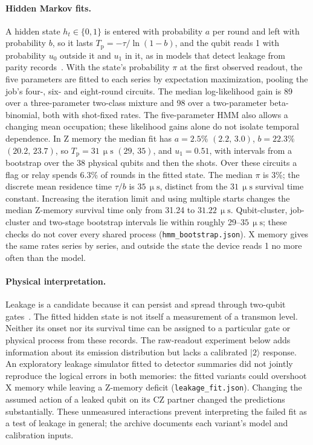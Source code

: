 \documentclass[aps,pra,reprint,nofootinbib,longbibliography,floatfix,showkeys]{revtex4-2}
\newcommand{\ket}[1]{\lvert #1\rangle}
\newcommand{\us}{\,\upmu\mathrm{s}}
\newcommand{\ci}[2]{\ensuremath{(#1,\,#2)}}
\begin{document}
\paragraph*{Hidden Markov fits.}
A hidden state $h_t \in \{0, 1\}$ is entered with probability $a$ per round and left with probability $b$, so it lasts $T_\mathrm{p} = -\tau/\ln(1-b)$, and the qubit reads 1 with probability $u_0$ outside it and $u_1$ in it, as in models that detect leakage from parity records~\cite{bultink2020protecting,varbanov2020leakage}.
With the state's probability $\pi$ at the first observed readout, the five parameters are fitted to each series by expectation maximization, pooling the job's four-, six- and eight-round circuits.
The median log-likelihood gain is 89 over a three-parameter two-class mixture and 98 over a two-parameter beta-binomial, both with shot-fixed rates.
The five-parameter HMM also allows a changing mean occupation; these likelihood gains alone do not isolate temporal dependence.
In Z memory the median fit has $a = 2.5\%$ \ci{2.2}{3.0}, $b = 22.3\%$ \ci{20.2}{23.7}, so $T_\mathrm{p} = 31\us$ \ci{29}{35}, and $u_1 = 0.51$, with intervals from a bootstrap over the 38 physical qubits and then the shots.
Over these circuits a flag or relay spends 6.3\% of rounds in the fitted state.
The median $\pi$ is 3\%; the discrete mean residence time $\tau/b$ is $35\us$, distinct from the $31\us$ survival time constant.
Increasing the iteration limit and using multiple starts changes the median Z-memory survival time only from 31.24 to $31.22\us$.
Qubit-cluster, job-cluster and two-stage bootstrap intervals lie within roughly 29--$35\us$; these checks do not cover every shared process (\texttt{hmm\_bootstrap.json}).
X memory gives the same rates series by series, and outside the state the device reads 1 no more often than the model.

\paragraph*{Physical interpretation.}
Leakage is a candidate because it can persist and spread through two-qubit gates~\cite{mcewen2021removing,miao2023overcoming}.
The fitted hidden state is not itself a measurement of a transmon level.
Neither its onset nor its survival time can be assigned to a particular gate or physical process from these records.
The raw-readout experiment below adds information about its emission distribution but lacks a calibrated $\ket{2}$ response.
An exploratory leakage simulator fitted to detector summaries did not jointly reproduce the logical errors in both memories: the fitted variants could overshoot X memory while leaving a Z-memory deficit (\texttt{leakage\_fit.json}).
Changing the assumed action of a leaked qubit on its CZ partner changed the predictions substantially.
These unmeasured interactions prevent interpreting the failed fit as a test of leakage in general; the archive documents each variant's model and calibration inputs.
\end{document}
